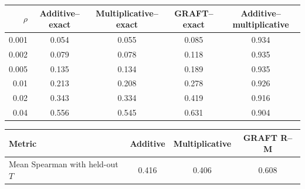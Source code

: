 \begin{tabular}{rcccc}
\toprule
$\rho$ & Additive--exact & Multiplicative--exact & GRAFT--exact & Additive--multiplicative \\
\midrule
0.001 & 0.054 & 0.055 & 0.085 & 0.934 \\
0.002 & 0.079 & 0.078 & 0.118 & 0.935 \\
0.005 & 0.135 & 0.134 & 0.189 & 0.935 \\
0.01 & 0.213 & 0.208 & 0.278 & 0.926 \\
0.02 & 0.343 & 0.334 & 0.419 & 0.916 \\
0.04 & 0.556 & 0.545 & 0.631 & 0.904 \\
\bottomrule
\end{tabular}

\begin{tabular}{lccc}
\toprule
Metric & Additive & Multiplicative & GRAFT R--M \\
\midrule
Mean Spearman with held-out $T$ & 0.416 & 0.406 & 0.608 \\
\bottomrule
\end{tabular}
